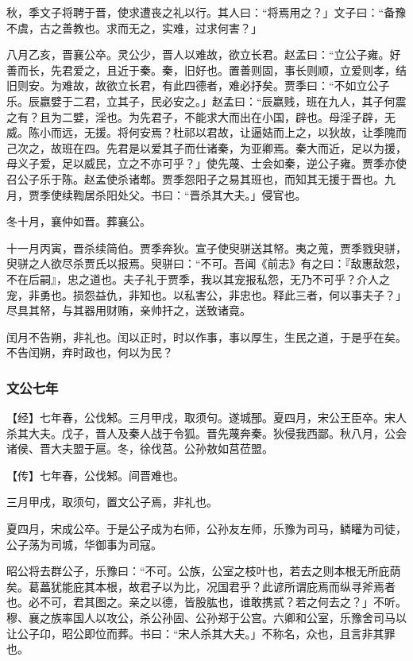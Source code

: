 \documentclass[]{article}
\begin{document}
秋，季文子将聘于晋，使求遭丧之礼以行。其人曰：``将焉用之？」文子曰：``备豫不虞，古之善教也。求而无之，实难，过求何害？」

八月乙亥，晋襄公卒。灵公少，晋人以难故，欲立长君。赵孟曰：``立公子雍。好善而长，先君爱之，且近于秦。秦，旧好也。置善则固，事长则顺，立爱则孝，结旧则安。为难故，故欲立长君，有此四德者，难必抒矣。贾季曰：``不如立公子乐。辰嬴嬖于二君，立其子，民必安之。」赵孟曰：``辰嬴贱，班在九人，其子何震之有？且为二嬖，淫也。为先君子，不能求大而出在小国，辟也。母淫子辟，无威。陈小而远，无援。将何安焉？杜祁以君故，让逼姞而上之，以狄故，让季隗而己次之，故班在四。先君是以爱其子而仕诸秦，为亚卿焉。秦大而近，足以为援，母义子爱，足以威民，立之不亦可乎？」使先蔑、士会如秦，逆公子雍。贾季亦使召公子乐于陈。赵孟使杀诸郫。贾季怨阳子之易其班也，而知其无援于晋也。九月，贾季使续鞫居杀阳处父。书曰：``晋杀其大夫。」侵官也。

冬十月，襄仲如晋。葬襄公。

十一月丙寅，晋杀续简伯。贾季奔狄。宣子使臾骈送其帑。夷之蒐，贾季戮臾骈，臾骈之人欲尽杀贾氏以报焉。臾骈曰：``不可。吾闻《前志》有之曰：『敌惠敌怨，不在后嗣』，忠之道也。夫子礼于贾季，我以其宠报私怨，无乃不可乎？介人之宠，非勇也。损怨益仇，非知也。以私害公，非忠也。释此三者，何以事夫子？」尽具其帑，与其器用财贿，亲帅扞之，送致诸竟。

闰月不告朔，非礼也。闰以正时，时以作事，事以厚生，生民之道，于是乎在矣。不告闰朔，弃时政也，何以为民？

\hypertarget{header-n1122}{%
\subsubsection{文公七年}\label{header-n1122}}

【经】七年春，公伐邾。三月甲戌，取须句。遂城郚。夏四月，宋公王臣卒。宋人杀其大夫。戊子，晋人及秦人战于令狐。晋先蔑奔秦。狄侵我西鄙。秋八月，公会诸侯、晋大夫盟于扈。冬，徐伐莒。公孙敖如莒莅盟。

【传】七年春，公伐邾。间晋难也。

三月甲戌，取须句，置文公子焉，非礼也。

夏四月，宋成公卒。于是公子成为右师，公孙友左师，乐豫为司马，鳞矔为司徒，公子荡为司城，华御事为司寇。

昭公将去群公子，乐豫曰：``不可。公族，公室之枝叶也，若去之则本根无所庇荫矣。葛藟犹能庇其本根，故君子以为比，况国君乎？此谚所谓庇焉而纵寻斧焉者也。必不可，君其图之。亲之以德，皆股肱也，谁敢携贰？若之何去之？」不听。穆、襄之族率国人以攻公，杀公孙固、公孙郑于公宫。六卿和公室，乐豫舍司马以让公子卬，昭公即位而葬。书曰：``宋人杀其大夫。」不称名，众也，且言非其罪也。
\end{document}
